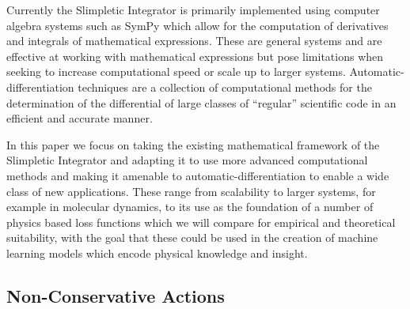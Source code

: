 \documentclass[10pt]{iopart}
\def\SI{Slimpletic Integrator}
\newcommand{\autodiff}{automatic-differentiation}
\begin{document}
Currently the \SI{} is primarily implemented using computer algebra systems such as SymPy\cite{sympy} which allow for the computation of derivatives and integrals of mathematical expressions. These are general systems and are effective at working with mathematical expressions but pose limitations when seeking to increase computational speed or scale up to larger systems. Automatic-differentiation  techniques are a collection of computational methods for the determination of the differential of large classes of \enquote{regular} scientific code in an efficient and accurate manner.

In this paper we focus on taking the existing mathematical framework of the \SI{} and adapting it to use more advanced computational methods and making it amenable to \autodiff{} to enable a wide class of new applications. These range from scalability to larger systems, for example in molecular dynamics, to its use as the foundation of a number of physics based loss functions which we will compare for empirical and theoretical suitability, with the goal that these could be used in the creation of machine learning models which encode physical knowledge and insight.


\subsection{Non-Conservative Actions}
\label{sec:intro-nc-actions}
\end{document}
